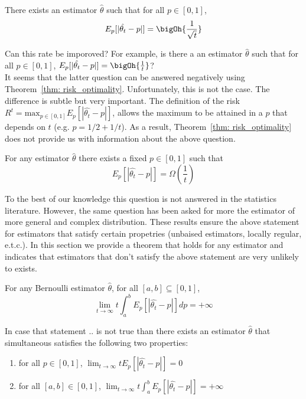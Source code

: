 \begin{theorem}
There exists an estimator $\hat{\theta}$ such that for all $p\in[0,1]$, $$E_p[|\hat{\theta_t} - p|] = \bigOh{\frac{1}{\sqrt{t}}}$$ 
\end{theorem} Can this rate be imporoved? For example, is there a an estimator $\hat{\theta}$ such that for all $p\in [0,1]$, $E_p[|\hat{\theta_t} - p|] = \bigOh{\frac{1}{t}}$?\\

\noindent It seems that the latter question can be answered negatively using Theorem~\ref{thm: risk_optimality}. Unfortunately, this is not the case. The difference is subtle but very important. The definition of the risk $R^t = \text{max}_{p \in [0,1]}E_p[|\hat{\theta_t}-p|]$, allows the maximum to be attained in a $p$ that depends on $t$ (e.g. $p=1/2+1/t$). As a result, Theorem~\ref{thm: risk_optimality} does not provide us with information about the above question.


\begin{theorem}
For any estimator $\hat{\theta}$ there exists a fixed $p\in[0,1]$ such that $$E_p[|\hat{\theta_t} - p|] = \Omega(\frac{1}{t})$$
\end{theorem}

\noindent To the best of our knowledge this question is not answered in the statistics literature. However, the same question has been asked for more the estimator of more general and complex distribution. These results ensure the above statement for estimators that satisfy certain propetries (unbaised estimators, locally regular, e.t.c.). In this section we provide a theorem that holds for any estimator and indicates that estimators that don't satisfy the above statement are very unlikely to exists.

\begin{theorem}
For any Bernoulli estimator $\hat{\theta}$, for all $[a,b] \subseteq [0,1]$,
$$ \lim_{t \to \infty}t \int_{a}^{b}E_p[|\hat{\theta_t} -p|]dp = +\infty$$
\end{theorem} In case that statement .. is not true than there exists an estimator $\hat{\theta}$ that simultaneous satisfies the following two properties:
\begin{enumerate}
 \item for all $p\in[0,1]$, $\lim_{t \to \infty}t E_p[|\hat{\theta_t} - p|]=0$
 \item for all $[a,b] \in [0,1]$, $\lim_{t \to \infty}t \int_a^b E_p[|\hat{\theta_t} - p|]=+\infty$
\end{enumerate}

